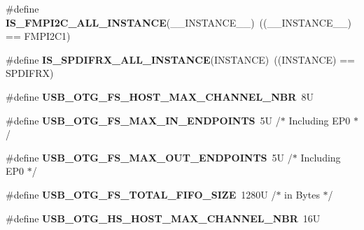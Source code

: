 \begin{DoxyCompactItemize}
\item 
\mbox{\label{group___exported__macros_ga0e0b999a82562c4a2e04e51ebd1fa99e}} 
\#define {\bfseries I\+S\+\_\+\+F\+M\+P\+I2\+C\+\_\+\+A\+L\+L\+\_\+\+I\+N\+S\+T\+A\+N\+CE}(\+\_\+\+\_\+\+I\+N\+S\+T\+A\+N\+C\+E\+\_\+\+\_\+)~((\+\_\+\+\_\+\+I\+N\+S\+T\+A\+N\+C\+E\+\_\+\+\_\+) == F\+M\+P\+I2\+C1)
\item 
\mbox{\label{group___exported__macros_gade241d237a03a97ae57fccecd093ff30}} 
\#define {\bfseries I\+S\+\_\+\+S\+P\+D\+I\+F\+R\+X\+\_\+\+A\+L\+L\+\_\+\+I\+N\+S\+T\+A\+N\+CE}(I\+N\+S\+T\+A\+N\+CE)~((I\+N\+S\+T\+A\+N\+CE) == S\+P\+D\+I\+F\+RX)
\item 
\mbox{\label{group___exported__macros_ga4c58971ce9062c1c7bc42e1c7ea4df32}} 
\#define {\bfseries U\+S\+B\+\_\+\+O\+T\+G\+\_\+\+F\+S\+\_\+\+H\+O\+S\+T\+\_\+\+M\+A\+X\+\_\+\+C\+H\+A\+N\+N\+E\+L\+\_\+\+N\+BR}~8U
\item 
\mbox{\label{group___exported__macros_gaccec7ca403e63ea963c363ceb7301ca6}} 
\#define {\bfseries U\+S\+B\+\_\+\+O\+T\+G\+\_\+\+F\+S\+\_\+\+M\+A\+X\+\_\+\+I\+N\+\_\+\+E\+N\+D\+P\+O\+I\+N\+TS}~5\+U    /$\ast$ Including E\+P0 $\ast$/
\item 
\mbox{\label{group___exported__macros_ga1d58ab8276cfdef9aa868bfdd2590aae}} 
\#define {\bfseries U\+S\+B\+\_\+\+O\+T\+G\+\_\+\+F\+S\+\_\+\+M\+A\+X\+\_\+\+O\+U\+T\+\_\+\+E\+N\+D\+P\+O\+I\+N\+TS}~5\+U    /$\ast$ Including E\+P0 $\ast$/
\item 
\mbox{\label{group___exported__macros_ga1e726d88af0f77cb8a49ff7b666fd990}} 
\#define {\bfseries U\+S\+B\+\_\+\+O\+T\+G\+\_\+\+F\+S\+\_\+\+T\+O\+T\+A\+L\+\_\+\+F\+I\+F\+O\+\_\+\+S\+I\+ZE}~1280\+U /$\ast$ in Bytes $\ast$/
\item 
\mbox{\label{group___exported__macros_ga974d43b38d7e7578fa7ac69c64dcc473}} 
\#define {\bfseries U\+S\+B\+\_\+\+O\+T\+G\+\_\+\+H\+S\+\_\+\+H\+O\+S\+T\+\_\+\+M\+A\+X\+\_\+\+C\+H\+A\+N\+N\+E\+L\+\_\+\+N\+BR}~16U
\item 
\mbox{\label{group___exported__macros_gae79bbfa7391870814f10c8025ade8a2a}} 

\end{DoxyCompactItemize}
